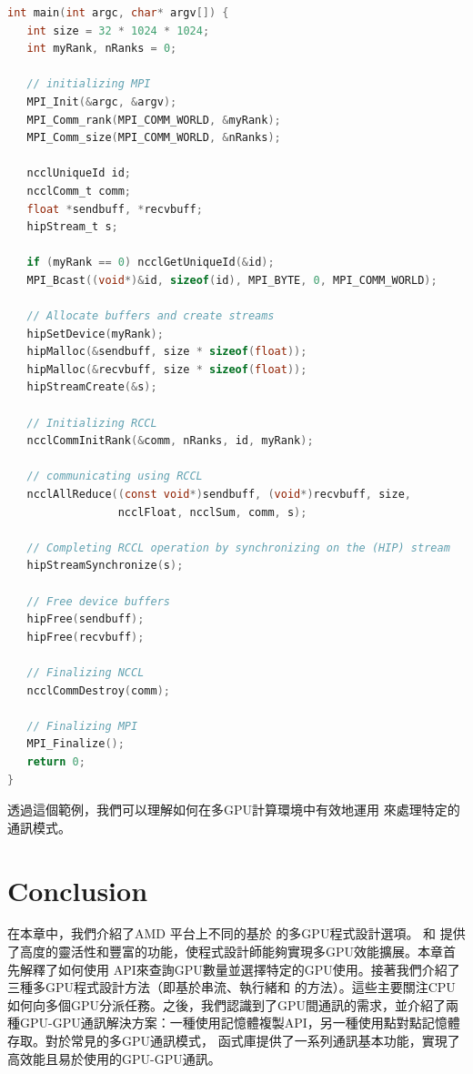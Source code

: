 \begin{lstlisting}[language=C, caption={混合使用\term{MPI} 和\term{RCCL AllReduce}}, captionpos=t, label={lst:mpi_rccl_allreduce}]
int main(int argc, char* argv[]) {
   int size = 32 * 1024 * 1024;
   int myRank, nRanks = 0;
   
   // initializing MPI
   MPI_Init(&argc, &argv);
   MPI_Comm_rank(MPI_COMM_WORLD, &myRank);
   MPI_Comm_size(MPI_COMM_WORLD, &nRanks);
   
   ncclUniqueId id;
   ncclComm_t comm;
   float *sendbuff, *recvbuff;
   hipStream_t s;
   
   if (myRank == 0) ncclGetUniqueId(&id);
   MPI_Bcast((void*)&id, sizeof(id), MPI_BYTE, 0, MPI_COMM_WORLD);
   
   // Allocate buffers and create streams
   hipSetDevice(myRank);
   hipMalloc(&sendbuff, size * sizeof(float));
   hipMalloc(&recvbuff, size * sizeof(float));
   hipStreamCreate(&s);
   
   // Initializing RCCL
   ncclCommInitRank(&comm, nRanks, id, myRank);
   
   // communicating using RCCL
   ncclAllReduce((const void*)sendbuff, (void*)recvbuff, size,
                 ncclFloat, ncclSum, comm, s);
                 
   // Completing RCCL operation by synchronizing on the (HIP) stream
   hipStreamSynchronize(s);
   
   // Free device buffers
   hipFree(sendbuff);
   hipFree(recvbuff);
   
   // Finalizing NCCL
   ncclCommDestroy(comm);
   
   // Finalizing MPI
   MPI_Finalize();
   return 0;
}
\end{lstlisting}

透過這個範例，我們可以理解如何在多GPU計算環境中有效地運用 來處理特定的通訊模式。

\section{Conclusion}

在本章中，我們介紹了AMD  平台上不同的基於 的多GPU程式設計選項。 和 提供了高度的靈活性和豐富的功能，使程式設計師能夠實現多GPU效能擴展。本章首先解釋了如何使用 API來查詢GPU數量並選擇特定的GPU使用。接著我們介紹了三種多GPU程式設計方法（即基於串流、執行緒和 的方法）。這些主要關注CPU如何向多個GPU分派任務。之後，我們認識到了GPU間通訊的需求，並介紹了兩種GPU-GPU通訊解決方案：一種使用記憶體複製API，另一種使用點對點記憶體存取。對於常見的多GPU通訊模式， 函式庫提供了一系列通訊基本功能，實現了高效能且易於使用的GPU-GPU通訊。